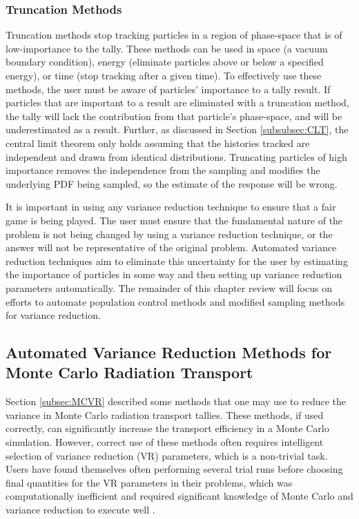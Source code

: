 \subsubsection*{Truncation Methods}

Truncation methods stop tracking particles in a region of phase-space that is of
low-importance to the tally. These methods can be used in space (a vacuum boundary
condition), energy (eliminate particles above or below a specified energy), or
time (stop
tracking after a given time). To effectively use these methods, the user must be
aware of
particles' importance to a tally result. If particles that are important to a
result are
 eliminated with a truncation method, the tally will lack the contribution from
 that particle's phase-space, and will be underestimated as a result. Further,
 as discussed in Section \ref{subsubsec:CLT}, the central limit theorem only
 holds assuming that the histories tracked are independent and drawn from
 identical distributions.
 Truncating particles of high importance removes the independence from the
 sampling and modifies the underlying PDF being sampled,
 so the estimate of the response will be wrong.

It is important in using any variance reduction technique to ensure that a
fair game
is being played. The user must ensure that the fundamental nature of the problem
is not
being changed by using a variance reduction technique, or the answer will not be
representative of the original problem. Automated variance reduction techniques aim to
eliminate this uncertainty for the user by estimating the importance of
particles in some
 way and then setting up variance reduction parameters automatically.
The remainder of this chapter review will focus on efforts to
automate population
control methods and modified sampling methods for variance reduction.

\subsection{Automated Variance Reduction Methods for Monte Carlo Radiation
Transport}
\label{subsec:AutomatedMCVR}

Section \ref{subsec:MCVR} described some methods that one may use to reduce the
variance in Monte Carlo radiation transport tallies. These methods, if used
correctly, can significantly increase the transport efficiency in a Monte Carlo
simulation. However, correct use of these methods often requires intelligent
selection of variance reduction (VR) parameters, which is a non-trivial task. Users
have found themselves often performing several trial runs before choosing final
quantities for the VR
parameters in their problems, which was computationally
inefficient and required significant knowledge of Monte Carlo and variance
reduction to execute well \cite{booth_automatic_1982}.

